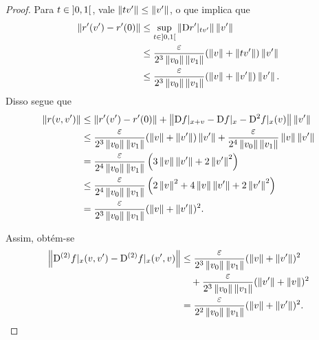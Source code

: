 \begin{proof}
Para $t \in \intaa{0}{1}$, vale $\nor{tv'} \leq \nor{v'}$, o que implica que
	\begin{align*}
	\nor{r'(v') - r'(0)} &\leq \sup_{t \in \intaa{0}{1}} \nor{\D r'|_{tv'}} \nor{v'} \\
		&\leq \frac{\varepsilon}{2^3\nor{v_0}\nor{v_1}} (\nor{v} + \nor{tv'})\nor{v'} \\
		&\leq \frac{\varepsilon}{2^3\nor{v_0}\nor{v_1}} (\nor{v} + \nor{v'})\nor{v'}.
	\end{align*}
Disso segue que
	\begin{align*}
	\nor{r(v,v')} &\leq \nor{r'(v') - r'(0)} + \nor{\D f|_{x+v} - \D f|_x - \D^2 f|_x(v)}\nor{v'} \\
		&\leq \frac{\varepsilon}{2^3\nor{v_0}\nor{v_1}} (\nor{v} + \nor{v'})\nor{v'} + \frac{\varepsilon}{2^4\nor{v_0}\nor{v_1}} \nor{v}\nor{v'} \\
		&= \frac{\varepsilon}{2^4\nor{v_0}\nor{v_1}} \left(3\nor{v}\nor{v'} + 2\nor{v'}^2 \right) \\
		&\leq \frac{\varepsilon}{2^4\nor{v_0}\nor{v_1}} \left( 2\nor{v}^2 + 4\nor{v}\nor{v'} + 2\nor{v'}^2 \right) \\
		&= \frac{\varepsilon}{2^3\nor{v_0}\nor{v_1}} (\nor{v} + \nor{v'})^2.
	\end{align*}

Assim, obtém-se
	\begin{align*}
	\nor{\D^{(2)} f|_x(v,v') - \D^{(2)} f|_x(v',v)} &\leq \frac{\varepsilon}{2^3\nor{v_0}\nor{v_1}} (\nor{v} + \nor{v'})^2 \\
		&\quad + \frac{\varepsilon}{2^3\nor{v_0}\nor{v_1}} (\nor{v'} + \nor{v})^2 \\
		& = \frac{\varepsilon}{2^2\nor{v_0}\nor{v_1}} (\nor{v} + \nor{v'})^2.
	\end{align*}


\end{proof}
